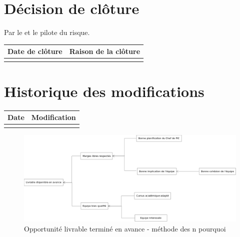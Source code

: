 \section*{Décision de clôture}
Par le \CP{} et le pilote du risque.
\begin{table}[h]
\centering
	\begin{tabularx}{16.8cm}{|X|X|}
	\hline
	\rowcolor{gray!40} Date de clôture & Raison de la clôture \\
	\hline
	  & \\
	\hline
	\end{tabularx}
\end{table}

\section*{Historique des modifications}
\begin{table}[h]
\centering
	\begin{tabularx}{16.8cm}{|X|X|}
	\hline
	\rowcolor{gray!40} Date & Modification \\
	\hline
	  & \\
	\hline
	\end{tabularx}
\end{table}
\newpage

\begin{figure}[!h]
	\centering
	\includegraphics[scale=0.27]{images/AnalyseOpportunite_nPourquoi_FDO002}
	\caption{\label{opportunite livrable termine en avance} Opportunité livrable terminé en avance - méthode des n pourquoi}
\end{figure}
